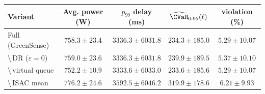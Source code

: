 \begin{tabular}{lcccc}
\toprule
Variant & Avg. power (W) & $p_{99}$ delay (ms) & $\widehat{\CVaR}_{0.95}(\ell)$ & violation (\%) \\
\midrule
Full (GreenSense) & $758.3\!\pm\!23.4$ & $3336.3\!\pm\!6031.8$ & $234.3\!\pm\!185.0$ & $5.29\!\pm\!10.07$ \\
$\setminus$\,DR ($\varepsilon{=}0$) & $759.0\!\pm\!23.6$ & $3336.3\!\pm\!6031.8$ & $239.9\!\pm\!189.5$ & $5.37\!\pm\!10.10$ \\
$\setminus$\,virtual queue & $752.2\!\pm\!10.9$ & $3333.6\!\pm\!6033.0$ & $233.6\!\pm\!185.6$ & $5.29\!\pm\!10.07$ \\
$\setminus$\,ISAC mean & $776.2\!\pm\!24.6$ & $3592.5\!\pm\!6046.2$ & $319.9\!\pm\!178.6$ & $6.21\!\pm\!9.93$ \\
\bottomrule
\end{tabular}
